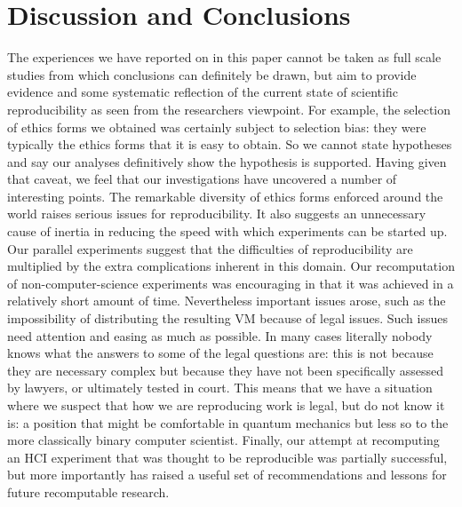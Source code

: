 \section{Discussion and Conclusions}
\label{s:discussion}

The experiences we have reported on in this paper cannot be taken as full scale studies from which conclusions can definitely be drawn, but aim to provide evidence and some systematic reflection of the current state of scientific reproducibility as seen from the researchers viewpoint.  For example, the 
selection of ethics forms we obtained was certainly subject to selection bias: they were typically the ethics forms that it is easy to obtain.  So we cannot state hypotheses and say our analyses definitively show the hypothesis is supported.   Having given that caveat, we feel that our investigations have uncovered a number of interesting points.  The remarkable diversity of ethics forms enforced around the world raises serious issues for reproducibility.  It also suggests an unnecessary cause of inertia in reducing the speed with which experiments can be started up.  Our parallel experiments suggest that the difficulties of reproducibility are 
multiplied by the extra complications inherent in this domain.  Our
recomputation of non-computer-science experiments was encouraging in
that it was achieved in a relatively short amount of time.
Nevertheless important issues arose, such as the impossibility of
distributing the resulting VM because of legal issues. 
Such issues need attention and easing as much as possible.  In many
cases literally nobody knows what the answers to some of the legal
questions are: this is not because they are necessary complex but
because they have not been specifically assessed by lawyers, or
ultimately tested in court.  This means that we have a situation where
we suspect that how we are reproducing work is legal, but do not know
it is: a position that might be comfortable in quantum mechanics but
less so to the more classically binary computer scientist. Finally,
our attempt at recomputing an HCI experiment that was thought to be
reproducible was partially successful, but more importantly has raised
a useful set of recommendations and lessons for future recomputable
research.
